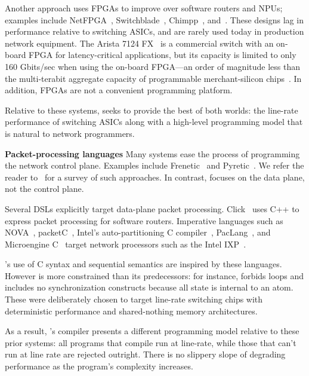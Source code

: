 Another approach uses FPGAs to improve over software routers and NPUs; examples
include NetFPGA~\cite{netfpga}, Switchblade~\cite{switchblade},
Chimpp~\cite{chimpp}, and~\cite{silver_bullet}. These designs lag in
performance relative to switching ASICs, and are rarely used today in
production network equipment. The Arista 7124 FX~\cite{7124fx} is a commercial
switch with an on-board FPGA for latency-critical applications, but its
capacity is limited to only 160 Gbits/sec when using the on-board FPGA---an
order of magnitude less than the multi-terabit aggregate capacity of
programmable merchant-silicon chips~\cite{xpliant}. In addition, FPGAs are not
a convenient programming platform.

Relative to these systems, \pktlanguage seeks to provide the best of both
worlds: the line-rate performance of switching ASICs along with a high-level
programming model that is natural to network programmers.

\textbf{Packet-processing languages}
Many systems ease the process of programming the network control plane.
Examples include Frenetic~\cite{frenetic} and Pyretic~\cite{pyretic}. We refer
the reader to~\cite{language_survey} for a survey of such approaches.
In contrast, \pktlanguage focuses on the data plane, not the control plane.

Several DSLs explicitly target data-plane packet processing. Click~\cite{click}
uses C++ to express packet processing for software routers. Imperative
languages such as NOVA~\cite{nova}, packetC~\cite{packetc}, Intel's
auto-partitioning C compiler~\cite{intel_uiuc_pldi}, PacLang~\cite{paclang_lang,
paclang_partitioner}, and Microengine C~\cite{microenginec, intel_ixa} target
network processors such as the Intel IXP~\cite{ixp2800, ixp4xx}.

\pktlanguage's use of C syntax and sequential semantics are inspired by these
languages. However \pktlanguage is more constrained than its predecessors: for
instance, \pktlanguage forbids loops and includes no synchronization constructs
because all state is internal to an atom. These were deliberately chosen to
target line-rate switching chips with deterministic performance and
shared-nothing memory architectures.

As a result, \pktlanguage's compiler presents a different programming model
relative to these prior systems: all \pktlanguage programs that compile run at
line-rate, while those that can't run at line rate are rejected outright. There
is no slippery slope of degrading performance as the program's complexity
increases.

